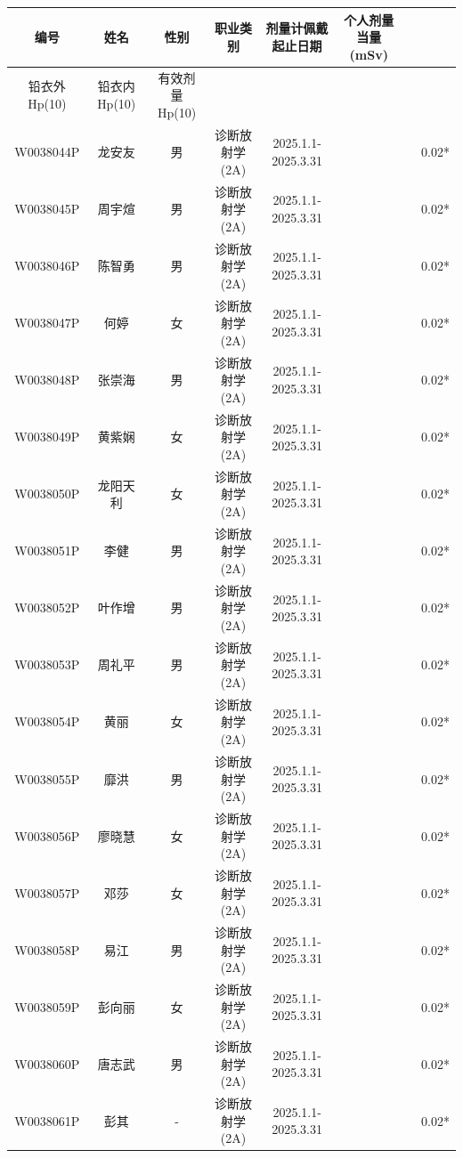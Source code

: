 \begin{table}[H]
\centering
\begin{tabular}{|c|c|c|c|c|c|c|c|}
\hline
编号 & 姓名 & 性别 & 职业类别 & 剂量计佩戴起止日期 & 个人剂量当量(mSv) &  &  \\
\hline
铅衣外Hp(10) & 铅衣内Hp(10) & 有效剂量Hp(10) &  &  &  &  &  \\
\hline
W0038044P & 龙安友 & 男 & 诊断放射学(2A) & 2025.1.1-2025.3.31 &  &  & 0.02* \\
\hline
W0038045P & 周宇煊 & 男 & 诊断放射学(2A) & 2025.1.1-2025.3.31 &  &  & 0.02* \\
\hline
W0038046P & 陈智勇 & 男 & 诊断放射学(2A) & 2025.1.1-2025.3.31 &  &  & 0.02* \\
\hline
W0038047P & 何婷 & 女 & 诊断放射学(2A) & 2025.1.1-2025.3.31 &  &  & 0.02* \\
\hline
W0038048P & 张崇海 & 男 & 诊断放射学(2A) & 2025.1.1-2025.3.31 &  &  & 0.02* \\
\hline
W0038049P & 黄紫娴 & 女 & 诊断放射学(2A) & 2025.1.1-2025.3.31 &  &  & 0.02* \\
\hline
W0038050P & 龙阳天利 & 女 & 诊断放射学(2A) & 2025.1.1-2025.3.31 &  &  & 0.02* \\
\hline
W0038051P & 李健 & 男 & 诊断放射学(2A) & 2025.1.1-2025.3.31 &  &  & 0.02* \\
\hline
W0038052P & 叶作增 & 男 & 诊断放射学(2A) & 2025.1.1-2025.3.31 &  &  & 0.02* \\
\hline
W0038053P & 周礼平 & 男 & 诊断放射学(2A) & 2025.1.1-2025.3.31 &  &  & 0.02* \\
\hline
W0038054P & 黄丽 & 女 & 诊断放射学(2A) & 2025.1.1-2025.3.31 &  &  & 0.02* \\
\hline
W0038055P & 靡洪 & 男 & 诊断放射学(2A) & 2025.1.1-2025.3.31 &  &  & 0.02* \\
\hline
W0038056P & 廖晓慧 & 女 & 诊断放射学(2A) & 2025.1.1-2025.3.31 &  &  & 0.02* \\
\hline
W0038057P & 邓莎 & 女 & 诊断放射学(2A) & 2025.1.1-2025.3.31 &  &  & 0.02* \\
\hline
W0038058P & 易江 & 男 & 诊断放射学(2A) & 2025.1.1-2025.3.31 &  &  & 0.02* \\
\hline
W0038059P & 彭向丽 & 女 & 诊断放射学(2A) & 2025.1.1-2025.3.31 &  &  & 0.02* \\
\hline
W0038060P & 唐志武 & 男 & 诊断放射学(2A) & 2025.1.1-2025.3.31 &  &  & 0.02* \\
\hline
W0038061P & 彭其 & - & 诊断放射学(2A) & 2025.1.1-2025.3.31 &  &  & 0.02* \\

\end{tabular}
\end{table}
